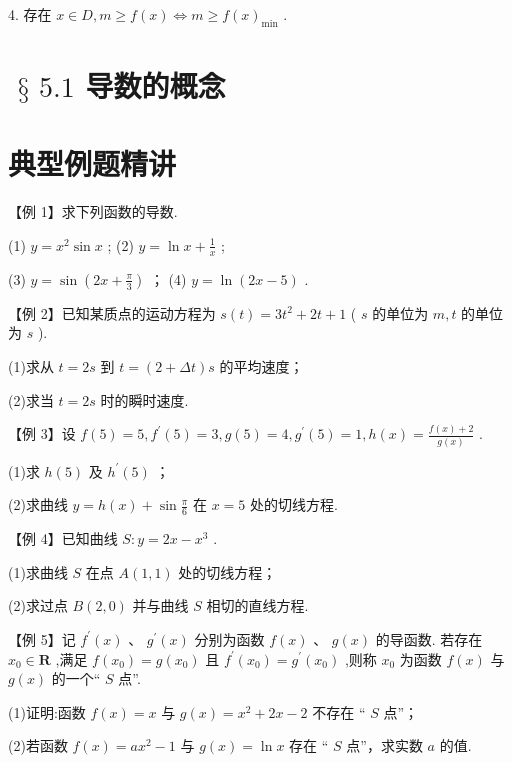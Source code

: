 4. 存在 $x \in  D,m \geq  f\left( x\right)  \Leftrightarrow  m \geq  f{\left( x\right) }_{\min }$ .

\section*{$\text{ § }{5.1}$ 导数的概念}

\section*{典型例题精讲}

【例 1】求下列函数的导数.

(1) $y = {x}^{2}\sin x$ ; (2) $y = \ln x + \frac{1}{x}$ ;

(3) $y = \sin \left( {{2x} + \frac{\pi }{3}}\right)$ ； (4) $y = \ln \left( {{2x} - 5}\right)$ .

【例 2】已知某质点的运动方程为 $s\left( t\right)  = 3{t}^{2} + {2t} + 1$ ( $s$ 的单位为 ${m},t$ 的单位为 ${s}$ ).

(1)求从 $t = {2{s}}$ 到 $t = \left( {2 + {\Delta t}}\right) {s}$ 的平均速度；

(2)求当 $t = {2{s}}$ 时的瞬时速度.

【例 3】设 $f\left( 5\right)  = 5,{f}^{\prime }\left( 5\right)  = 3,g\left( 5\right)  = 4,{g}^{\prime }\left( 5\right)  = 1,h\left( x\right)  = \frac{f\left( x\right)  + 2}{g\left( x\right) }$ .

(1)求 $h\left( 5\right)$ 及 ${h}^{\prime }\left( 5\right)$ ；

(2)求曲线 $y = h\left( x\right)  + \sin \frac{\pi }{6}$ 在 $x = 5$ 处的切线方程.

【例 4】已知曲线 $S : y = {2x} - {x}^{3}$ .

(1)求曲线 $S$ 在点 $A\left( {1,1}\right)$ 处的切线方程；

(2)求过点 $B\left( {2,0}\right)$ 并与曲线 $S$ 相切的直线方程.


【例 5】记 ${f}^{\prime }\left( x\right) \text{ 、 }{g}^{\prime }\left( x\right)$ 分别为函数 $f\left( x\right) \text{ 、 }g\left( x\right)$ 的导函数. 若存在 ${x}_{0} \in  \mathbf{R}$ ,满足 $f\left( {x}_{0}\right)  = g\left( {x}_{0}\right)$ 且 ${f}^{\prime }\left( {x}_{0}\right)  = {g}^{\prime }\left( {x}_{0}\right)$ ,则称 ${x}_{0}$ 为函数 $f\left( x\right)$ 与 $g\left( x\right)$ 的一个“ $S$ 点”.

(1)证明:函数 $f\left( x\right)  = x$ 与 $g\left( x\right)  = {x}^{2} + {2x} - 2$ 不存在 “ $S$ 点”；

(2)若函数 $f\left( x\right)  = a{x}^{2} - 1$ 与 $g\left( x\right)  = \ln x$ 存在 “ $S$ 点”，求实数 $a$ 的值.

